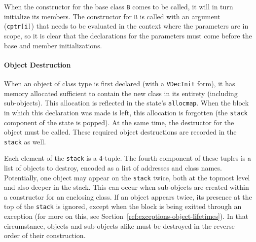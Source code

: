 \documentclass[11pt]{article}
\begin{document}
When the constructor for the base class \texttt{B} comes to be called,
it will in turn initialize its members.  The constructor for
\texttt{B} is called with an argument (\texttt{cptr[i]}) that needs to
be evaluated in the context where the parameters are in scope, so it
is clear that the declarations for the parameters must come before the
base and member initializations.

\paragraph{Object Destruction}%
%
When an object of class type is first declared (with a
\texttt{VDecInit} form), it has memory allocated sufficient to contain
the new class in its entirety (including sub-objects).  This
allocation is reflected in the state's \texttt{allocmap}.  When the
block in which this declaration was made is left, this allocation is
forgotten (the \texttt{stack} component of the state is popped).  At
the same time, the destructor for the object must be called.  These
required object destructions are recorded in the \texttt{stack} as
well.

Each element of the \texttt{stack} is a 4-tuple.  The fourth component
of these tuples is a list of objects to destroy, encoded as a list of
addresses and class names.  Potentially, one object may appear on the
\texttt{stack} twice, both at the topmost level and also deeper in the
stack.  This can occur when sub-objects are created within a
constructor for an enclosing class.  If an object appears twice, its
presence at the top of the \texttt{stack} is ignored, except when the
block is being exitted through an exception (for more on this, see
Section~\ref{ref:exceptions-object-lifetimes}).  In that circumstance,
objects and sub-objects alike must be destroyed in the reverse order
of their construction.
\end{document}
